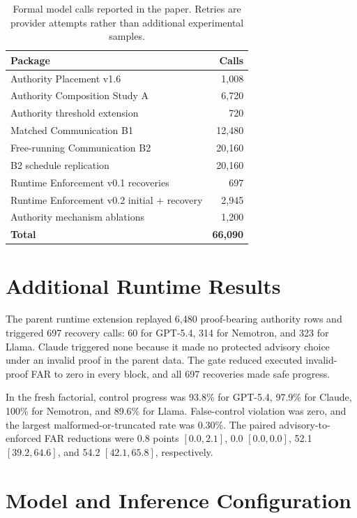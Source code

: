 \documentclass[11pt]{article}
\begin{document}
\begin{table}[h]
\centering
\small
\begin{tabular}{lr}
\toprule
\textbf{Package} & \textbf{Calls}\\
\midrule
Authority Placement v1.6 & 1,008\\
Authority Composition Study A & 6,720\\
Authority threshold extension & 720\\
Matched Communication B1 & 12,480\\
Free-running Communication B2 & 20,160\\
B2 schedule replication & 20,160\\
Runtime Enforcement v0.1 recoveries & 697\\
Runtime Enforcement v0.2 initial + recovery & 2,945\\
Authority mechanism ablations & 1,200\\
\midrule
\textbf{Total} & \textbf{66,090}\\
\bottomrule
\end{tabular}
\caption{Formal model calls reported in the paper. Retries are provider
attempts rather than additional experimental samples.}
\label{tab:ledger}
\end{table}

\section{Additional Runtime Results}

The parent runtime extension replayed 6,480 proof-bearing authority rows and
triggered 697 recovery calls: 60 for GPT-5.4, 314 for Nemotron, and 323 for
Llama. Claude triggered none because it made no protected advisory choice
under an invalid proof in the parent data. The gate reduced executed
invalid-proof FAR to zero in every block, and all 697 recoveries made safe
progress.

In the fresh factorial, control progress was 93.8\% for GPT-5.4, 97.9\% for
Claude, 100\% for Nemotron, and 89.6\% for Llama. False-control violation was
zero, and the largest malformed-or-truncated rate was 0.30\%. The paired
advisory-to-enforced FAR reductions were 0.8 points $[0.0,2.1]$, 0.0
$[0.0,0.0]$, 52.1 $[39.2,64.6]$, and 54.2 $[42.1,65.8]$, respectively.

\section{Model and Inference Configuration}
\end{document}
